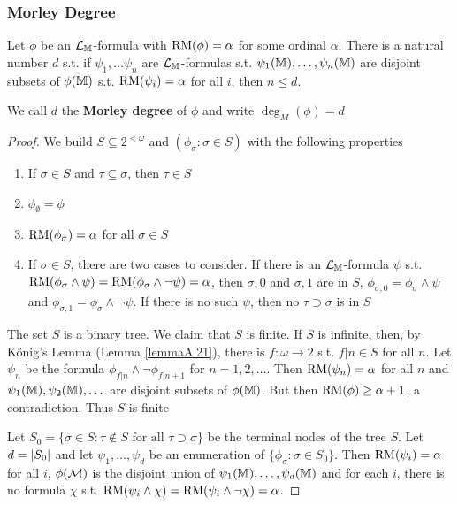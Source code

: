 \documentclass[11pt]{article}
\begin{document}
\subsubsection{Morley Degree}
\label{sec:org8efc614}
\begin{proposition}[]
Let \(\phi\) be an \(\mathcal{L}_{\mathbb{M}}\)-formula with \(\operatorname{RM}(\phi)=\alpha\) for some ordinal \(\alpha\). There is a natural
number \(d\) s.t. if \(\psi_1,\dots\psi_n\) are \(\mathcal{L}_{\mathbb{M}}\)-formulas s.t. \(\psi_1(\mathbb{M}),\dots,\psi_n(\mathbb{M})\) are disjoint
subsets of \(\phi(\mathbb{M})\) s.t. \(\operatorname{RM}(\psi_i)=\alpha\) for all \(i\), then \(n\le d\).

We call \(d\) the \textbf{Morley degree} of \(\phi\) and write \(\deg_M(\phi)=d\)
\end{proposition}

\begin{proof}
We build \(S\subseteq 2^{<\omega}\) and \((\phi_\sigma:\sigma\in S)\) with the following properties
\begin{enumerate}
\item If \(\sigma\in S\) and \(\tau\subseteq\sigma\), then \(\tau\in S\)
\item \(\phi_\emptyset=\phi\)
\item \(\operatorname{RM}(\phi_\sigma)=\alpha\) for all \(\sigma\in S\)
\item If \(\sigma\in S\), there are two cases to consider. If there is an \(\mathcal{L}_{\mathbb{M}}\)-formula \(\psi\)
s.t. \(\operatorname{RM}(\phi_\sigma\wedge\psi)=\operatorname{RM}(\phi_\sigma\wedge\neg\psi)=\alpha\), then \(\sigma,0\) and \(\sigma,1\) are in \(S\), \(\phi_{\sigma,0}=\phi_\sigma\wedge\psi\)
and \(\phi_{\sigma,1}=\phi_\sigma\wedge\neg\psi\). If there is no such \(\psi\), then no \(\tau\supset\sigma\) is in \(S\)
\end{enumerate}


The set \(S\) is a binary tree. We claim that \(S\) is finite. If \(S\) is infinite, then, by
Kőnig's Lemma (Lemma \ref{lemmaA.21}), there is \(f:\omega\to 2\) s.t. \(f|n\in S\) for all \(n\).
Let \(\psi_n\) be the formula \(\phi_{f|n}\wedge\neg\phi_{f|n+1}\) for \(n=1,2,\dots\). Then \(\operatorname{RM}(\psi_n)=\alpha\) for
all \(n\)
and \(\psi_1(\mathbb{M}),\psi_2(\mathbb{M}),\dots\) are disjoint subsets of \(\phi(\mathbb{M})\). But then \(\operatorname{RM}(\phi)\ge\alpha+1\), a
contradiction. Thus \(S\) is finite

Let \(S_0=\{\sigma\in S:\tau\notin S\text{ for all }\tau\supset\sigma\}\) be the terminal nodes of the tree \(S\).
Let \(d=\abs{S_0}\) and let \(\psi_1,\dots,\psi_d\) be an enumeration of \(\{\phi_\sigma:\sigma\in S_0\}\).
Then \(\operatorname{RM}(\psi_i)=\alpha\) for all \(i\), \(\phi(\mathcal{M})\) is the disjoint union of \(\psi_1(\mathbb{M}),\dots,\psi_d(\mathbb{M})\) and for
each \(i\), there is no formula \(\chi\) s.t. \(\operatorname{RM}(\psi_i\wedge\chi)=\operatorname{RM}(\psi_i\wedge\neg\chi)=\alpha\).


\end{proof}
\end{document}
